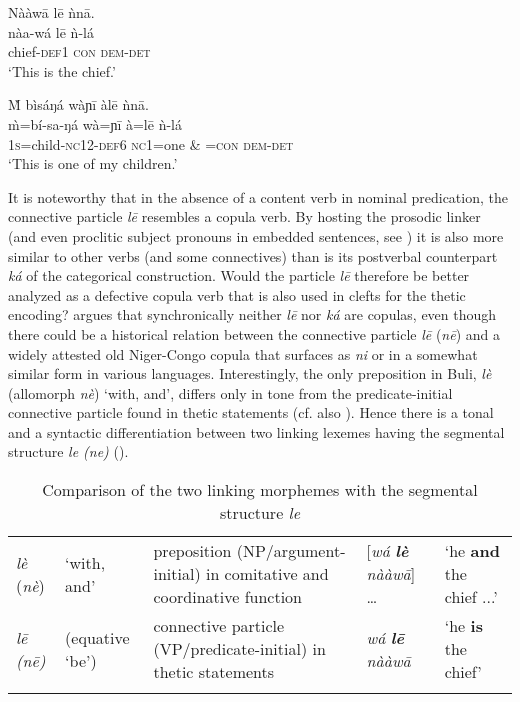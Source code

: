 \documentclass[output=paper]{langsci/langscibook}
\begin{document}
\ea
\glll \textup{}  Nààw\={a}    l\={e}  ǹn\={a}.\\
  \textup{  nàa-wá    l\={e}  ǹ-lá}\\
       chief-\textsc{def1}  \textsc{con}  \textsc{dem}-\textsc{det}\\
\glt ‘This is the chief.’ \citep[88]{Schwarz2007}
\z

\ea
\glll \textup{}  \`{M}   bìsáŋá    wàɲ\={i}    àl\={e}    ǹn\={a}.\\
  \textup{  \`{m}=bí-sa-ŋá    wà=ɲ\={i}    à=l\={e}    ǹ-lá}\\
       1\textsc{s}=child-\textsc{nc}12-\textsc{def}6  \textsc{nc}1=one  \& =\textsc{con}  \textsc{dem-det}\\
\glt ‘This is one of my children.’ \citep[88]{Schwarz2007}
\z

It is noteworthy that in the absence of a content verb in nominal predication, the connective particle \textit{l\={e}} resembles a copula verb. By hosting the prosodic linker (and even proclitic subject pronouns in embedded sentences, see ) it is also more similar to other verbs (and some connectives) than is its postverbal counterpart \textit{ká} of the categorical construction. Would the particle \textit{l\={e}} therefore be better analyzed as a defective copula verb that is also used in clefts for the thetic encoding? \citet{Schwarz2009} argues that synchronically neither \textit{l\={e}} nor \textit{ká} are copulas, even though there could be a historical relation between the connective particle \textit{l\={e}} (\textit{n\={e}}) and a widely attested old Niger-Congo copula that surfaces as \textit{ni} or in a somewhat similar form in various languages. Interestingly, the only preposition in Buli, \textit{lè} (allomorph \textit{nè}) ‘with, and’, differs only in tone from the predicate-initial connective particle found in thetic statements (cf. also \citealt{Schwarz2010a}). Hence there is a tonal and a syntactic differentiation between two linking lexemes having the segmental structure \textit{le (ne)} ().


\begin{table}
\caption{Comparison of the two linking morphemes with the segmental structure \textit{le}}
\label{tab:3}


\begin{tabularx}{\textwidth}{XXXXX}
\lsptoprule

{\textit{lè} (\textit{nè})}  & {‘with, and’} & {preposition (NP/argument-initial) in comitative and coordinative function} & {[\textit{wá} \textbf{\textit{lè}}\textit{ nààw\={a}}] …} & {‘he \textbf{and} the chief ...’}\\
{\textit{l\={e} (n\={e})}} & {(equative ‘be’)} & {connective particle (VP/predicate-initial) in thetic statements} & {\textit{wá} \textbf{\textit{l\={e}}}\textit{ nààw\={a}}} & {‘he \textbf{is} the chief’}\\
\lspbottomrule
\end{tabularx}
\end{table}
\end{document}
